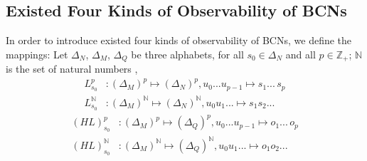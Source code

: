 \documentclass[conference]{IEEEtran} %
\begin{document}
\subsection{Existed Four Kinds of Observability of BCNs}
In order to introduce existed four kinds of observability of BCNs, we define the mappings: Let $\Delta_N$, $\Delta_M$, $\Delta_Q$ be three alphabets, for all $s_0\in \Delta_N$ and all $p\in \mathbb{Z}_+$; $\mathbb{N}$ is the set of natural numbers \cite{Zhang2016Observability},
\begin{equation}
\begin{split}
L^p_{s_0} &: (\Delta_M)^p\mapsto(\Delta_N)^p, u_0 . . . u_{p-1} \mapsto s_1 . . .\, s_p\\
L^{\mathbb{N}}_{s_0} &: (\Delta_M)^{\mathbb{N}}\mapsto(\Delta_N)^{\mathbb{N}}, u_0 u_1 . . .  \mapsto s_1 s_2 . . .
\end{split}
\end{equation}
\begin{equation}
\begin{split}
(HL)^p_{s_0} &: (\Delta_M)^p\mapsto(\Delta_Q)^p, u_0 . . . u_{p-1} \mapsto o_1 . . .\, o_p\\
(HL)^{\mathbb{N}}_{s_0} &: (\Delta_M)^{\mathbb{N}}\mapsto(\Delta_Q)^{\mathbb{N}}, u_0 u_1 . . .  \mapsto o_1 o_2 . . .
\end{split}
\end{equation}
\end{document}
